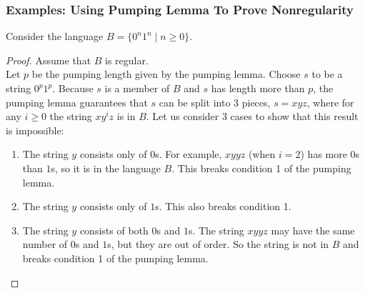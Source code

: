 \documentclass[11pt,a4paper]{article}
\begin{document}
\subsubsection{Examples: Using Pumping Lemma To Prove Nonregularity}
\begin{example}
    Consider the language $B=\{0^n1^n\mid n\geq 0\}$.

    \begin{proof}
        Assume that $B$ is regular. \\
        
        Let $p$ be the pumping length given by the pumping lemma.
        Choose $s$ to be a string $0^p1^p$. Because $s$ is a member of $B$ and $s$ has length more than $p$, the pumping lemma guarantees that $s$ can be split into 3 pieces, $s=xyz$, where for any $i\geq 0$ the string $xy^iz$ is in $B$.
        Let us consider 3 cases to show that this result is impossible:

        \begin{enumerate}
            \item The string $y$ consists only of $0$s. For example, $xyyz$ (when $i=2$) has more $0$s than $1$s, so it is in the language $B$. This breaks condition 1 of the pumping lemma.
            \item The string $y$ consists only of $1$s. This also breaks condition 1.
            \item The string $y$ consists of both $0$s and $1$s. The string $xyyz$ may have the same number of $0$s and $1$s, but they are out of order. So the string is not in $B$ and breaks condition 1 of the pumping lemma.
        \end{enumerate}
    \end{proof}
\end{example}
\end{document}
